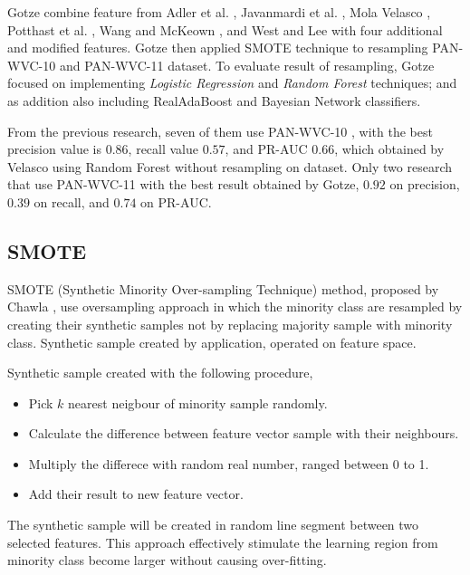 \documentclass[conference,compsoc,a4paper,twocolumn,final]{IEEEtran}
\begin{document}
Gotze \cite{gotze2014advanced} combine feature from
Adler et al. \cite{adler2011wikipedia},
Javanmardi et al. \cite{javanmardi2011vandalism},
Mola Velasco \cite{mola2012wikipedia},
Potthast et al. \cite{potthast2008automatic},
Wang and McKeown \cite{wang2010got}, and
West and Lee \cite{west2011multilingual}
with four additional and modified features.
Gotze then applied SMOTE technique to resampling PAN-WVC-10 and PAN-WVC-11
dataset.
To evaluate result of resampling, Gotze focused on implementing
\textit{Logistic Regression} and \textit{Random Forest} techniques;
and as addition also including RealAdaBoost and Bayesian Network classifiers.

From the previous research, seven of them use PAN-WVC-10
\cite{adler2010detecting}
\cite{adler2011wikipedia}
\cite{gotze2014advanced}
\cite{harpalani2011language}
\cite{mola2012wikipedia}
\cite{wang2010got}
\cite{west2011multilingual},
with the best precision value is $0.86$, recall value $0.57$, and PR-AUC
$0.66$, which obtained by Velasco using Random Forest without resampling on
dataset.
Only two research that use PAN-WVC-11
\cite{gotze2014advanced}
\cite{west2011multilingual}
with the best result obtained by Gotze, $0.92$ on precision, $0.39$
on recall, and $0.74$ on PR-AUC.

\subsection{SMOTE}
\label{subsection:smote}

SMOTE (Synthetic Minority Over-sampling Technique) method, proposed by Chawla
\cite{chawla2002smote},
use oversampling approach in which the minority class are resampled by creating
their synthetic samples not by replacing majority sample with minority class.
Synthetic sample created by application, operated on feature space.

Synthetic sample created with the following procedure,
\begin{itemize}
\item Pick $k$ nearest neigbour of minority sample randomly.
\item Calculate the difference between feature vector sample with their
neighbours.
\item Multiply the differece with random real number, ranged between 0 to 1.
\item Add their result to new feature vector.
\end{itemize}

The synthetic sample will be created in random line segment between two
selected features.
This approach effectively stimulate the learning region from minority class
become larger without causing over-fitting.
\end{document}
